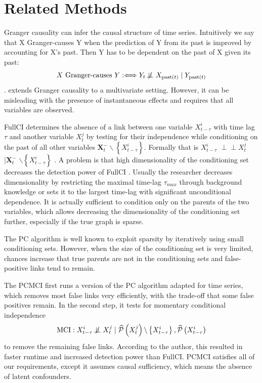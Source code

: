 \documentclass[conference]{IEEEtran}
\begin{document}
\section{Related Methods}

Granger causality can infer the causal structure of time series. Intuitively we say that X Granger-causes Y when the prediction of Y from its past is improved by accounting for X's past.
Then Y has to be dependent on the past of X given its past:
\begin{equation}
X \text { Granger-causes } Y: \Longleftrightarrow Y_{t} \not\!\perp\!\!\!\perp X_{\operatorname{past}(t)}  \mid Y_{\operatorname{past}(t)}
\end{equation} \cite{peters_elements_2018}.
\cite{granger_testing_1980} extends Granger causality to a multivariate setting. However, it can be misleading with the presence of instantaneous effects \cite{granger_clive_recent_1988} and requires that all variables are observed\cite{granger_testing_1980}.

FullCI determines the absence of a link between one variable $X_{t-\tau}^{i}$ with time lag $\tau$ and another variable $X_{t}^{j}$ by testing for their independence while conditioning on the past of all other variables $\mathbf{X}_{t}^{-} \backslash\left\{X_{t-\tau}^{i}\right\}$. 
Formally that is
$X_{t-\tau}^{i} $
$\!\perp\!\!\!\perp X_{t}^{j} $
$\mid \mathbf{X}_{t}^{-}$
$ \backslash\left\{X_{t-\tau}^{i}\right\}$ \cite{runge_pcmci_2019}.
A problem is that high dimensionality of the conditioning set decreases the detection power of FullCI \cite{runge_pcmci_2019}.
Usually the researcher decreases dimensionality by restricting the maximal time-lag $\tau_{max}$ through background knowledge or sets it to the largest time-lag with significant unconditional dependence\cite{runge_pcmci_2019}.
It is actually sufficient to condition only on the parents of the two variables\cite{pearl_causality_2000}, which allows decreasing the dimensionality of the conditioning set further, especially if the true graph is sparse.

The PC algorithm is well known to exploit sparsity by iteratively using small conditioning sets. However, when the size of the conditioning set is very limited, chances increase that true parents are not in the conditioning sets and false-positive links tend to remain.

The PCMCI first runs a version of the PC algorithm adapted for time series, which removes most false links very efficiently, with the trade-off that some false positives remain. In the second step, it tests for momentary conditional independence
\begin{equation}
\mathrm{MCI}: X_{t-\tau}^{i} \not\!\perp\!\!\!\perp X_{t}^{j} \mid \widehat{\mathcal{P}}\left(X_{t}^{j}\right) \backslash\left\{X_{t-\tau}^{i}\right\}, \widehat{\mathcal{P}}\left(X_{t-\tau}^{i}\right)
\end{equation}
to remove the remaining false links\cite{runge_pcmci_2019}.
According to the author, this resulted in faster runtime and increased detection power than FullCI\cite{runge_pcmci_2019}.
PCMCI satisfies all of our requirements, except it assumes causal sufficiency, which means the absence of latent confounders.
\end{document}
